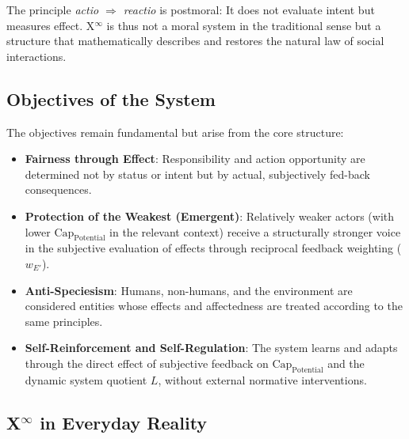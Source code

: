\documentclass[12pt]{scrartcl}
\begin{document}
The principle \emph{actio $\Rightarrow$ reactio} is postmoral: It does not evaluate intent but measures effect. X$^\infty$ is thus not a moral system in the traditional sense but a structure that mathematically describes and restores the natural law of social interactions.

\subsection{Objectives of the System}
The objectives remain fundamental but arise from the core structure:
\begin{itemize}
    \item \textbf{Fairness through Effect}: Responsibility and action opportunity are determined not by status or intent but by actual, subjectively fed-back consequences.
    \item \textbf{Protection of the Weakest (Emergent)}: Relatively weaker actors (with lower $\text{Cap}_{\text{Potential}}$ in the relevant context) receive a structurally stronger voice in the subjective evaluation of effects through reciprocal feedback weighting ($w_{E'}$).
    \item \textbf{Anti-Speciesism}: Humans, non-humans, and the environment are considered entities whose effects and affectedness are treated according to the same principles.
    \item \textbf{Self-Reinforcement and Self-Regulation}: The system learns and adapts through the direct effect of subjective feedback on $\text{Cap}_{\text{Potential}}$ and the dynamic system quotient $L$, without external normative interventions.
\end{itemize}

\subsection{\texorpdfstring{X$^\infty$}{X-Infinity} in Everyday Reality}
\label{sec:Alltagsrealitaet}
\end{document}
